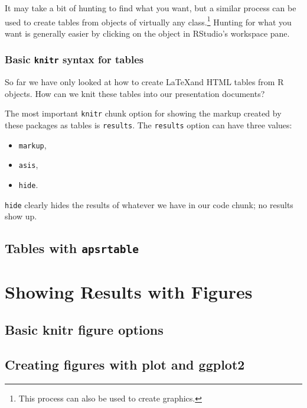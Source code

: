 \documentclass[ChapterTOCs,krantz1]{krantz}\usepackage{graphicx, color}
\begin{document}
{{It may take a bit of hunting to find what you want, but a similar process can be used to create tables from objects of virtually any class.\footnote{This process can also be used to create graphics.} Hunting for what you want is generally easier by clicking on the object in RStudio's workspace pane.

\subsection{Basic \texttt{knitr} syntax for tables}

So far we have only looked at how to create \LaTeX and HTML tables from R objects. How can we knit these tables into our presentation documents?

The most important \texttt{knitr} chunk option for showing the markup created by these packages as tables is \texttt{results}. The \texttt{results} option can have three values:

\begin{itemize}
\item
  \texttt{markup},
\item
  \texttt{asis},
\item
  \texttt{hide}.
\end{itemize}
\texttt{hide} clearly hides the results of whatever we have in our code chunk; no results show up.

\section{Tables with \texttt{apsrtable}}






\chapter{Showing Results with Figures}\label{FiguresChapter}


\section{Basic knitr figure options}

\section{Creating figures with plot and ggplot2}

}}
\end{document}

